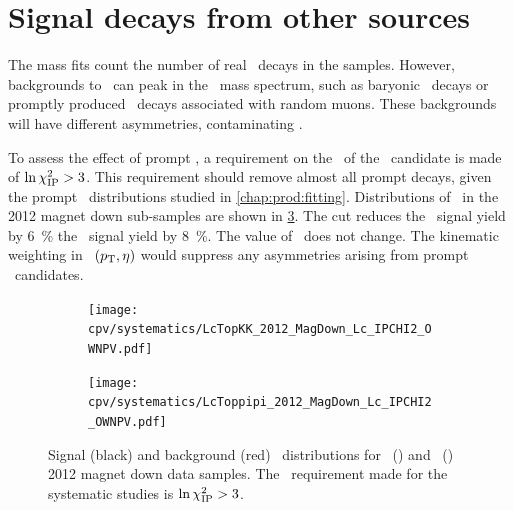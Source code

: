 \begin{table}
  \centering
  \caption{%
    Shifts in the measurement of \dACP\ due to background asymmetries not 
    complete removed during the kinematic weighting.
    The total shift $\Delta{A}$ is the sum of the individual ones, and all 
    shifts are given in \num{e-4}.
  }
  \label{tab:cpv:syst:asym:results}
  
\end{table}

\section{Signal decays from other sources}
\label{chap:cpv:syst:bkg}

The mass fits count the number of real \PLambdac\ decays in the samples.
However, backgrounds to \LbToLcmuX\ can peak in the \PLambdac\ mass spectrum, 
such as baryonic \PB\ decays or promptly produced \PLambdac\ decays associated 
with random muons.
These backgrounds will have different asymmetries, contaminating \dACP\@.

To assess the effect of prompt \PLambdac, a requirement on the \ipchisq\ of the 
\PLambdac\ candidate is made of $\ln\chi^2_{\textnormal{IP}} > 3$.
This requirement should remove almost all prompt decays, given the prompt 
\lnipchisq\ distributions studied in \cref{chap:prod:fitting}.
Distributions of \lnipchisq\ in the 2012 magnet down sub-samples are shown in 
\cref{fig:cpv:syst:ipchisq}.
The cut reduces the \pKK\ signal yield by \SI{6}{\percent} the \ppipi\ signal 
yield by \SI{8}{\percent}\@.
The value of \dACP\ does not change.
The kinematic weighting in \PLambdac\ $(p_{\textnormal{T}}, \eta)$ would suppress any 
asymmetries arising from prompt \PLambdac\ candidates.

\begin{figure}
  \begin{subfigure}[b]{0.5\textwidth}
    \texttt{[image: cpv/systematics/LcTopKK\_2012\_MagDown\_Lc\_IPCHI2\_OWNPV.pdf]}
    \caption{\pKK}
    \label{fig:cpv:syst:ipchisq:pKK}
  \end{subfigure}
  \begin{subfigure}[b]{0.5\textwidth}
    \texttt{[image: cpv/systematics/LcToppipi\_2012\_MagDown\_Lc\_IPCHI2\_OWNPV.pdf]}
    \caption{\ppipi}
    \label{fig:cpv:syst:ipchisq:ppipi}
  \end{subfigure}
  \caption{%
    Signal (black) and background (red) \lnipchisq\ distributions for 
    \pKK~() and 
    \ppipi~() 2012 magnet down data 
    samples.
    The \lnipchisq\ requirement made for the systematic studies is $\ln\chi^2_{\textnormal{IP}} 
    > 3$.
  }
  \label{fig:cpv:syst:ipchisq}
\end{figure}

